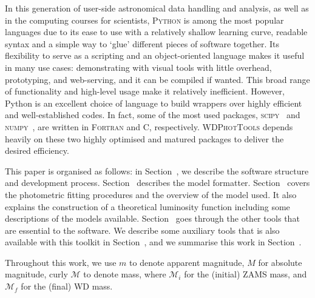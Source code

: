 \documentclass[fleqn,usenatbib]{rasti}
\begin{document}
In this generation of user-side astronomical data handling and
analysis, as well as in the computing courses for scientists, \textsc{Python} is
among the most popular languages due to its ease to use with a
relatively shallow learning curve, readable syntax and a simple way to `glue'
different pieces of software together. Its flexibility to serve as a scripting
and an object-oriented language makes it useful in many use cases: demonstrating
with visual tools with little overhead, prototyping, and web-serving, and it can
be compiled if wanted. This broad range of functionality and high-level usage
make it relatively inefficient. However, Python is an excellent choice of
language to build wrappers over highly efficient and well-established codes. In
fact, some of the most used packages,
\textsc{scipy}~\citep{2020NatMe..17..261V} and
\textsc{numpy}~\citep{2020Natur.585..357H}, are written in
\textsc{Fortran} and \textsc{C}, respectively.
\textsc{WDPhotTools} depends heavily on these two highly optimised and matured
packages to deliver the desired efficiency.

This paper is organised as follows: in Section~, we describe
the software structure and development process. Section~ describes
the model formatter. Section~ covers the photometric fitting
procedures and the overview of the model used. It also explains the
construction of a theoretical luminosity function including some descriptions
of the models available. Section~ goes through the other tools
that are essential to the software. We describe some auxiliary tools that is
also available with this toolkit in Section~, and we summarise this
work in Section~.

Throughout this work, we use $m$ to denote apparent magnitude, $M$ for
absolute magnitude, curly $\mathcal{M}$ to denote mass, where $\mathcal{M}_i$
for the (initial) ZAMS mass, and $\mathcal{M}_f$ for the (final) WD mass.
\end{document}
